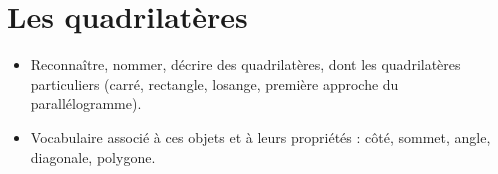 \themaG
\graphicspath{{../Ch21_Les_quadrilateres/Images/}}

\chapter{Les quadrilatères}
\label{C24}


\begin{prerequis}
   \begin{itemize}
      \item Reconnaître, nommer, décrire des quadrilatères, dont les quadrilatères particuliers (carré, rectangle, losange, première approche du parallélogramme).
      \item Vocabulaire associé à ces objets et à leurs propriétés : côté, sommet, angle, diagonale, polygone.
   \end{itemize}
\end{prerequis}

\vfill

